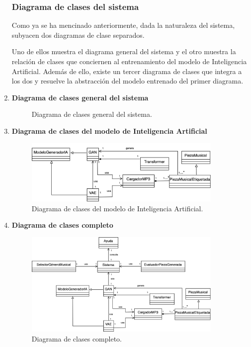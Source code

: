 \begin{enumerate}
  \subsubsection{Diagrama de clases del sistema}

  Como ya se ha mencinado anteriormente, dada la naturaleza del sistema, subyacen dos diagramas de clase separados.

  Uno de ellos muestra el diagrama general del sistema y el otro muestra la relación de clases que conciernen al entrenamiento del modelo de Inteligencia Artificial. Además de ello, existe un tercer diagrama de clases que integra a los dos y resuelve la abstracción del modelo entrenado del primer diagrama.

  \item \textbf{Diagrama de clases general del sistema}

  \begin{figure}[H]
    \centering
    
    \caption{Diagrama de clases general del sistema.}
  \end{figure}

  \item \textbf{Diagrama de clases del modelo de Inteligencia Artificial}

  \begin{figure}[H]
    \centering
    \includegraphics[width=0.9\textwidth]{images/diagrama-clases-ia.png}
    \caption{Diagrama de clases del modelo de Inteligencia Artificial.}
  \end{figure}


  \item \textbf{Diagrama de clases completo}

  \begin{figure}[H]
    \centering
    \includegraphics[width=0.9\textwidth]{images/diagrama-clases-completo.png}
    \caption{Diagrama de clases completo.}
  \end{figure}

\end{enumerate}